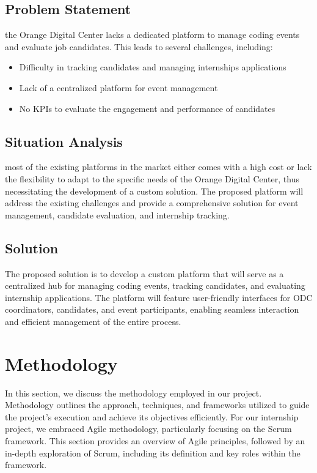 \subsection{Problem Statement}
the Orange Digital Center lacks a dedicated platform to manage coding 
events and evaluate job candidates. This leads to several challenges, including:

\begin{itemize}
      \item Difficulty in tracking candidates and managing internships
            applications
      \item Lack of a centralized platform for event management
      \item No KPIs to evaluate the engagement and performance of candidates
\end{itemize}

\subsection{Situation Analysis}
most of the existing platforms in the market either comes with a high cost or
lack the flexibility to adapt to the specific needs of the Orange Digital
Center, thus
necessitating the development of a custom solution. The proposed platform will
address the existing challenges and provide a comprehensive solution for event
management, candidate evaluation, and internship tracking.

\subsection{Solution}
The proposed solution is to develop a custom platform that will serve as a
centralized hub for managing coding events, tracking candidates, and evaluating
internship applications. The platform will feature user-friendly interfaces for
ODC coordinators, candidates, and event participants, enabling seamless
interaction and efficient management of the entire process.

\section{Methodology}
In this section, we discuss the methodology employed in our project.
Methodology outlines the approach, techniques, and frameworks utilized to guide
the project's execution and achieve its objectives efficiently. For our
internship project, we embraced Agile methodology, particularly focusing on the
Scrum framework. This section provides an overview of Agile principles,
followed by an in-depth exploration of Scrum, including its definition and key
roles within the framework.

